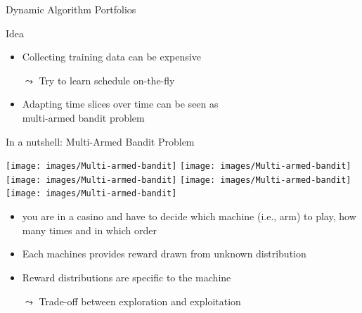 \begin{frame}[c]{Dynamic Algorithm Portfolios~}

\begin{block}{Idea}
\begin{itemize}
  \item Collecting training data can be expensive
  \item[$\leadsto$] Try to learn schedule on-the-fly
  \item Adapting time slices over time can be seen as\\ multi-armed bandit problem
\end{itemize}
\end{block}

\pause

\begin{block}{In a nutshell: Multi-Armed Bandit Problem}
\begin{center}
  \texttt{[image: images/Multi-armed-bandit]}
  \texttt{[image: images/Multi-armed-bandit]}
  \texttt{[image: images/Multi-armed-bandit]}
  \texttt{[image: images/Multi-armed-bandit]}
  \texttt{[image: images/Multi-armed-bandit]}
\end{center}
\vspace{-2em}
\begin{itemize}
  \item you are in a casino and have to decide which machine (i.e., arm) to play, how many times and in which order
  \item Each machines provides reward drawn from unknown distribution
  \item Reward distributions are specific to the machine
  \item[$\leadsto$] Trade-off between exploration and exploitation
\end{itemize}
\end{block}

\end{frame}
